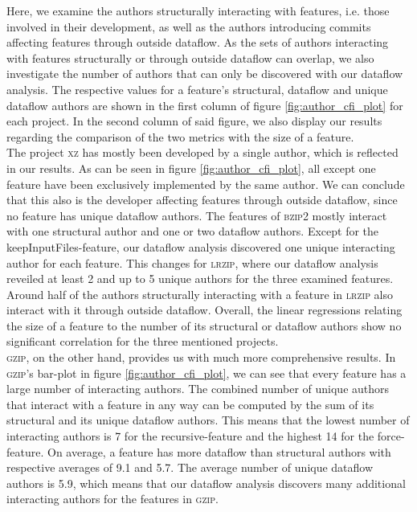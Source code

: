 Here, we examine the authors structurally interacting with features, i.e. those involved in their development, as well as the authors introducing commits affecting features through outside dataflow.
As the sets of authors interacting with features structurally or through outside dataflow can overlap, we also investigate the number of authors that can only be discovered with our dataflow analysis.
The respective values for a feature's structural, dataflow and unique dataflow authors are shown in the first column of figure \ref{fig:author_cfi_plot} for each project.
In the second column of said figure, we also display our results regarding the comparison of the two metrics with the size of a feature. \\
The project \textsc{xz} has mostly been developed by a single author, which is reflected in our results.
As can be seen in figure \ref{fig:author_cfi_plot}, all except one feature have  been exclusively implemented by the same author.
We can conclude that this also is the developer affecting features through outside dataflow, since no feature has unique dataflow authors.
The features of \textsc{bzip2} mostly interact with one structural author and one or two dataflow authors.
Except for the \textsf{keepInputFiles}-feature, our dataflow analysis discovered one unique interacting author for each feature.
This changes for \textsc{lrzip}, where our dataflow analysis reveiled at least 2 and up to 5 unique authors for the three examined features.
Around half of the authors structurally interacting with a feature in \textsc{lrzip} also interact with it through outside dataflow.
Overall, the linear regressions relating the size of a feature to the number of its structural or dataflow authors show no significant correlation for the three mentioned projects. \\
\textsc{gzip}, on the other hand, provides us with much more comprehensive results.
In \textsc{gzip}'s bar-plot in figure \ref{fig:author_cfi_plot}, we can see that every feature has a large number of interacting authors.
The combined number of unique authors that interact with a feature in any way can be computed by the sum of its structural and its unique dataflow authors.
This means that the lowest number of interacting authors is 7 for the \textsf{recursive}-feature and the highest 14 for the \textsf{force}-feature.
On average, a feature has more dataflow than structural authors with respective averages of 9.1 and 5.7.
The average number of unique dataflow authors is 5.9, which means that our dataflow analysis discovers many additional interacting authors for the features in \textsc{gzip}.

